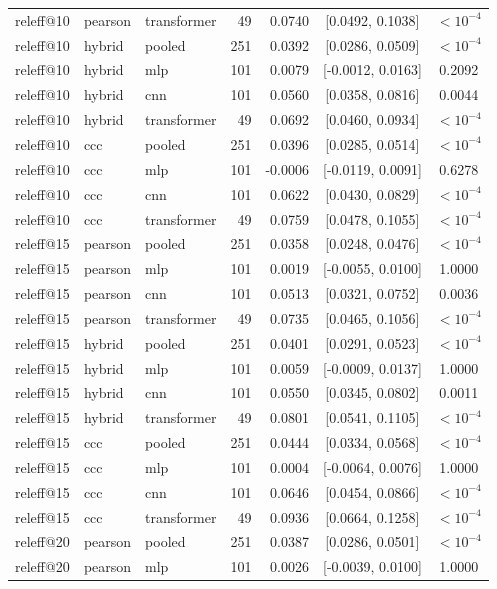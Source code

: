 \begin{longtable}{lllrrcc}
releff@10 & pearson & transformer & 49 & 0.0740 & [0.0492, 0.1038] & $<10^{-4}$ \\
releff@10 & hybrid & pooled & 251 & 0.0392 & [0.0286, 0.0509] & $<10^{-4}$ \\
releff@10 & hybrid & mlp & 101 & 0.0079 & [-0.0012, 0.0163] & 0.2092 \\
releff@10 & hybrid & cnn & 101 & 0.0560 & [0.0358, 0.0816] & 0.0044 \\
releff@10 & hybrid & transformer & 49 & 0.0692 & [0.0460, 0.0934] & $<10^{-4}$ \\
releff@10 & ccc & pooled & 251 & 0.0396 & [0.0285, 0.0514] & $<10^{-4}$ \\
releff@10 & ccc & mlp & 101 & -0.0006 & [-0.0119, 0.0091] & 0.6278 \\
releff@10 & ccc & cnn & 101 & 0.0622 & [0.0430, 0.0829] & $<10^{-4}$ \\
releff@10 & ccc & transformer & 49 & 0.0759 & [0.0478, 0.1055] & $<10^{-4}$ \\
releff@15 & pearson & pooled & 251 & 0.0358 & [0.0248, 0.0476] & $<10^{-4}$ \\
releff@15 & pearson & mlp & 101 & 0.0019 & [-0.0055, 0.0100] & 1.0000 \\
releff@15 & pearson & cnn & 101 & 0.0513 & [0.0321, 0.0752] & 0.0036 \\
releff@15 & pearson & transformer & 49 & 0.0735 & [0.0465, 0.1056] & $<10^{-4}$ \\
releff@15 & hybrid & pooled & 251 & 0.0401 & [0.0291, 0.0523] & $<10^{-4}$ \\
releff@15 & hybrid & mlp & 101 & 0.0059 & [-0.0009, 0.0137] & 1.0000 \\
releff@15 & hybrid & cnn & 101 & 0.0550 & [0.0345, 0.0802] & 0.0011 \\
releff@15 & hybrid & transformer & 49 & 0.0801 & [0.0541, 0.1105] & $<10^{-4}$ \\
releff@15 & ccc & pooled & 251 & 0.0444 & [0.0334, 0.0568] & $<10^{-4}$ \\
releff@15 & ccc & mlp & 101 & 0.0004 & [-0.0064, 0.0076] & 1.0000 \\
releff@15 & ccc & cnn & 101 & 0.0646 & [0.0454, 0.0866] & $<10^{-4}$ \\
releff@15 & ccc & transformer & 49 & 0.0936 & [0.0664, 0.1258] & $<10^{-4}$ \\
releff@20 & pearson & pooled & 251 & 0.0387 & [0.0286, 0.0501] & $<10^{-4}$ \\
releff@20 & pearson & mlp & 101 & 0.0026 & [-0.0039, 0.0100] & 1.0000 \\

\end{longtable}
